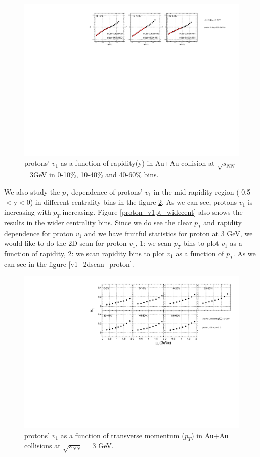 \begin{figure}[h]
\includegraphics[scale=0.8]{chapter3/fig/v1ypikp/protonp_v1y_wide_cent.pdf}
\caption{\label{proton_v1y_widecent} protons' $v_{1}$ as a function of rapidity(y) in Au+Au collision at $\sqrt{s_{NN}}$=3GeV in 0-10\%, 10-40\% and 40-60\% bins.}
\end{figure}

\clearpage

We also study the $p_{T}$ dependence of protons' $v_{1}$ in the mid-rapidity region (-0.5$<$y$<$0) in different centrality bins in the figure \ref{proton_v1pt_cent}. As we can see, protons $v_{1}$ is increasing with $p_{T}$ increasing. Figure \ref{proton_v1pt_widecent} also shows the results in the wider centrality bins. Since we do see the clear $p_{T}$ and rapidity dependence for proton $v_{1}$ and we have fruitful statistics for proton at 3 GeV, we would like to do the 2D scan for proton $v_{1}$, 1: we scan $p_{T}$ bins to plot $v_{1}$ as a function of rapidity, 2: we scan rapidity bins to plot $v_{1}$ as a function of $p_{T}$. As we can see in the figure \ref{v1_2dscan_proton}.

\begin{figure}[h]
\includegraphics[scale=0.7]{chapter3/fig/v1ptpikp/v1pt_cent_proton.pdf}
\caption{protons' $v_{1}$ as a function of transverse momentum ($p_{T}$) in Au+Au collisions at $\sqrt{s_{NN}}$ = 3 GeV.}
\label{proton_v1pt_cent}
\end{figure}

